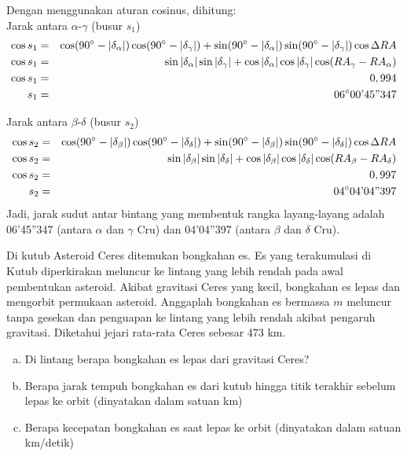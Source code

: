 \documentclass[11pt,fleqn]{exam}
\begin{document}
\begin{questions}
\begin{enumerate}[(a)]
Dengan menggunakan aturan cosinus, dihitung:\\
Jarak antara $\alpha$-$\gamma$ (busur $s_1$)\\
\begin{eqnarray*}
\cos s_1&=&\cos (90\text{\degree}-|\delta_{\alpha}|)\cos (90\text{\degree}-|\delta_{\gamma}|)+\sin (90\text{\degree}-|\delta_{\alpha}|)\sin (90\text{\degree}-|\delta_{\gamma}|)\cos \Delta RA\\
\cos s_1&=&\sin |\delta_{\alpha}|\sin |\delta_{\gamma}|+\cos |\delta_{\alpha}|\cos |\delta_{\gamma}|\cos (RA_{\gamma}-RA_{\alpha})\\
\cos s_1&=&0,994\\
s_1&=&06\text{\degree}00\text{'}45\text{''}347
\end{eqnarray*}

Jarak antara $\beta$-$\delta$ (busur $s_2$)\\
\begin{eqnarray*}
\cos s_2&=&\cos (90\text{\degree}-|\delta_{\beta}|)\cos (90\text{\degree}-|\delta_{\delta}|)+\sin (90\text{\degree}-|\delta_{\beta}|)\sin (90\text{\degree}-|\delta_{\delta}|)\cos \Delta RA\\
\cos s_2&=&\sin |\delta_{\beta}|\sin |\delta_{\delta}|+\cos |\delta_{\beta}|\cos |\delta_{\delta}|\cos (RA_{\beta}-RA_{\delta})\\
\cos s_2&=&0,997\\
s_2&=&04\text{\degree}04\text{'}04\text{''}397
\end{eqnarray*}
Jadi, jarak sudut antar bintang yang membentuk rangka layang-layang adalah 06'45''347 (antara $\alpha$ dan $\gamma$ Cru) dan 04'04''397 (antara $\beta$ dan $\delta$ Cru).
\end{enumerate}


\question Di kutub Asteroid Ceres ditemukan bongkahan es. Es yang terakumulasi di Kutub diperkirakan meluncur ke lintang yang lebih rendah pada awal pembentukan asteroid. Akibat gravitasi Ceres yang kecil, bongkahan es lepas dan mengorbit permukaan asteroid. Anggaplah bongkahan es bermassa $m$ meluncur tanpa gesekan dan penguapan ke lintang yang lebih rendah akibat pengaruh gravitasi. Diketahui jejari rata-rata Ceres sebesar 473 km.
\begin{enumerate}[(a)]
\item Di lintang berapa bongkahan es lepas dari gravitasi Ceres?
\item Berapa jarak tempuh bongkahan es dari kutub hingga titik terakhir sebelum lepas ke orbit (dinyatakan dalam satuan km)
\item Berapa kecepatan bongkahan es saat lepas ke orbit (dinyatakan dalam satuan km/detik)
\end{enumerate}


\end{questions}
\end{document}
